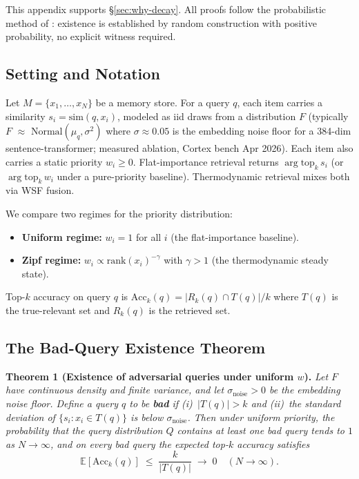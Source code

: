 \documentclass[11pt]{article}
\begin{document}
This appendix supports \S\ref{sec:why-decay}.  All proofs follow
the probabilistic method of \citet{ErdosSpencer1974}: existence is
established by random construction with positive probability, no
explicit witness required.

\subsection{Setting and Notation}
\label{app:erdos-setup}

Let $M = \{x_1, \dots, x_N\}$ be a memory store.  For a query $q$,
each item carries a similarity $s_i = \mathrm{sim}(q, x_i)$,
modeled as iid draws from a distribution $F$ (typically $F$
$\approx$ $\mathrm{Normal}(\mu_q, \sigma^2)$ where $\sigma \approx
0.05$ is the embedding noise floor for a 384-dim
sentence-transformer; measured ablation, Cortex bench Apr 2026).
Each item also carries a static priority $w_i \ge 0$.
Flat-importance retrieval returns $\arg\text{top}_k\, s_i$ (or
$\arg\text{top}_k\, w_i$ under a pure-priority baseline).
Thermodynamic retrieval mixes both via WSF fusion.

We compare two regimes for the priority distribution:
\begin{itemize}
  \item \textbf{Uniform regime:} $w_i = 1$ for all $i$ (the
        flat-importance baseline).
  \item \textbf{Zipf regime:} $w_i \propto \mathrm{rank}(x_i)^{-\gamma}$
        with $\gamma > 1$ (the thermodynamic steady state).
\end{itemize}
Top-$k$ accuracy on query $q$ is
$\mathrm{Acc}_k(q) = |R_k(q) \cap T(q)| / k$ where $T(q)$ is the
true-relevant set and $R_k(q)$ is the retrieved set.

\subsection{The Bad-Query Existence Theorem}
\label{app:erdos-thm1}

\textbf{Theorem 1 (Existence of adversarial queries under uniform
$w$).}
\emph{Let $F$ have continuous density and finite variance, and let
$\sigma_{\mathrm{noise}} > 0$ be the embedding noise floor.  Define
a query $q$ to be \textbf{bad} if (i)~$|T(q)| > k$ and (ii)~the
standard deviation of $\{s_i : x_i \in T(q)\}$ is below
$\sigma_{\mathrm{noise}}$.  Then under uniform priority, the
probability that the query distribution $Q$ contains at least one
bad query tends to $1$ as $N \to \infty$, and on every bad query
the expected top-$k$ accuracy satisfies}
\begin{equation}
\mathbb{E}[\mathrm{Acc}_k(q)] \;\le\; \frac{k}{|T(q)|}
\;\to\; 0 \quad (N \to \infty).
\label{eq:thm1}
\end{equation}
\end{document}
